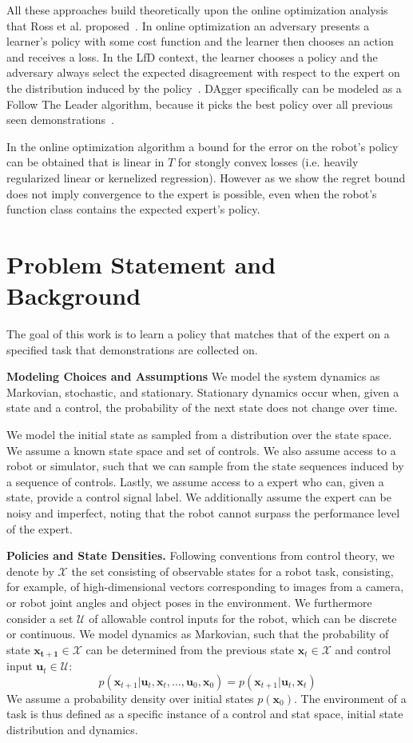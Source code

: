 \documentclass[10pt, conference]{ieeeconf}      %
\newcommand{\bu}{\mathbf{u}}
\newcommand{\bx}{\mathbf{x}}
\begin{document}
All these approaches build theoretically upon the online optimization analysis that Ross et al. proposed~\cite{ross2010reduction}. In online optimization an adversary presents a learner's policy with some cost function and the learner then chooses an action and receives a loss. In the LfD context, the learner chooses a policy and the adversary always select the expected disagreement with respect to the expert on the distribution induced by the policy~\cite{shalev2011online}. DAgger specifically can be modeled as a Follow The Leader algorithm, because it picks the best policy over all previous seen demonstrations~\cite{ross2010reduction}.

In the online optimization algorithm a bound for the error on the robot's policy can be obtained that is linear in $T$ for stongly convex losses (i.e. heavily regularized linear or kernelized regression). However as we show the regret bound does not imply convergence to the expert is possible, even when the robot's function class contains the expected expert's policy. 


\section{Problem Statement and Background}\label{sec:PS}
The goal of this work is to learn a policy that matches that of the expert on a specified task that demonstrations are collected on. 

\noindent\textbf{Modeling Choices and Assumptions}  We model the system dynamics as Markovian, stochastic, and stationary. Stationary dynamics occur when, given a state and a control, the probability of the next state does not change over time. 

We model the initial state as sampled from a distribution over the state space.
We assume a known state space and set of controls. We also assume access to a robot or simulator, such that we  can sample from the state sequences induced by a sequence of controls.   Lastly, we assume access to a expert who can, given a state, provide a control signal label. We additionally assume the expert can be noisy and imperfect, noting that the robot cannot surpass the performance level of the expert. 



\noindent\textbf{Policies and State Densities.}
Following conventions from control theory, we denote by $\mathcal{X}$ the set consisting of observable states for a robot task, consisting, for example, of 
high-dimensional vectors corresponding to images from a camera, or robot joint angles and object poses in the environment.
We furthermore consider a set $\mathcal{U}$ of allowable control inputs for the robot, which can be discrete or
continuous. We model dynamics as Markovian, such that the probability of state $\mathbf{x_{t+1}}\in
\mathcal{X}$ can be determined from the previous state $\mathbf{x}_t\in\mathcal{X}$ and control input $\mathbf{u}_t\in
\mathcal{U}$: 
$$p(\bx_{t+1}|\bu_{t},\bx_{t}, \ldots, \bu_{0}, \bx_{0})=p(\bx_{t+1}|\bu_{t}, \bx_t)$$
We assume a probability density over initial states $p(\bx_0)$. The environment of a task is thus defined as a specific instance of a control and stat space, initial state distribution and dynamics. 
\end{document}
